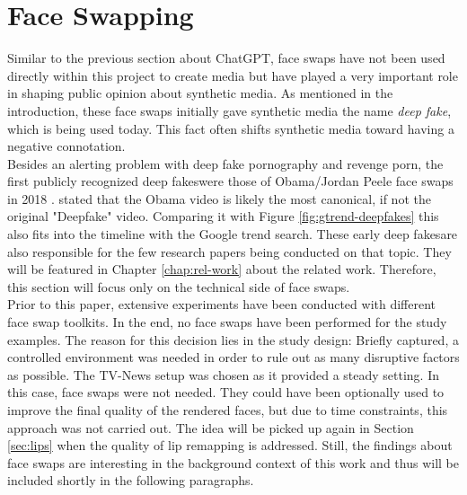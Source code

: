 \documentclass[
  a4paper,  %
  twoside,  %
  bibliography=totoc,
  headsepline,
  cleardoublepage=empty,
  parskip=half,
  draft=false
]{scrbook}
\begin{document}
\section{Face Swapping}
\label{sec:face-swapping}
Similar to the previous section about ChatGPT, face swaps have not been used directly within this project to create media but have played a very important role in shaping public opinion about synthetic media. As mentioned in the introduction, these face swaps initially gave synthetic media the name \textit{deep fake}, which is being used today. This fact often shifts synthetic media toward having a negative connotation. \\
Besides an alerting problem with deep fake pornography and revenge porn, the first publicly recognized deep fakeswere those of Obama/Jordan Peele face swaps in 2018 \cite{vincentWatchJordanPeele2018}. \citet{hancockSocialImpactDeepfakes2021} stated that the Obama video is likely the most canonical, if not the original "Deepfake" video.
Comparing it with Figure \ref{fig:gtrend-deepfakes} this also fits into the timeline with the Google trend search. These early deep fakesare also responsible for the few research papers being conducted on that topic. They will be featured in Chapter \ref{chap:rel-work} about the related work. Therefore, this section will focus only on the technical side of face swaps. \\
Prior to this paper, extensive experiments have been conducted with different face swap toolkits. In the end, no face swaps have been performed for the study examples. The reason for this decision lies in the study design: Briefly captured, a controlled environment was needed in order to rule out as many disruptive factors as possible. The TV-News setup was chosen as it provided a steady setting. In this case, face swaps were not needed. They could have been optionally used to improve the final quality of the rendered faces, but due to time constraints, this approach was not carried out. The idea will be picked up again in Section \ref{sec:lips} when the quality of lip remapping is addressed.
Still, the findings about face swaps are interesting in the background context of this work and thus will be included shortly in the following paragraphs.
\end{document}
